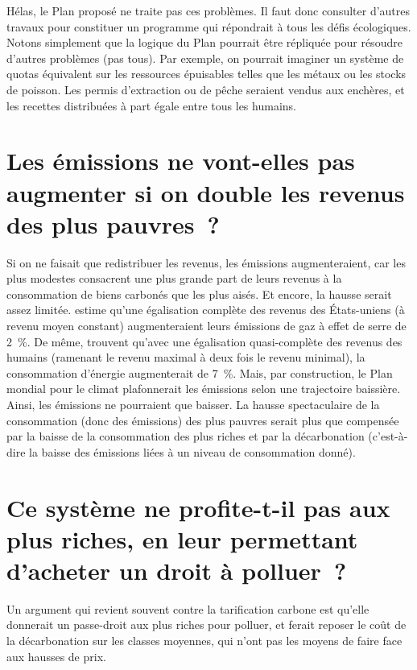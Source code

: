 \documentclass[a5paper,french,openany]{memoir}
\begin{document}
Hélas, le Plan proposé ne traite pas ces problèmes. Il faut donc consulter d'autres travaux pour constituer un programme qui répondrait à tous les défis écologiques. %
Notons simplement que la logique du Plan pourrait être répliquée pour résoudre d'autres problèmes (pas tous). Par exemple, on pourrait imaginer un système de quotas équivalent sur les ressources épuisables telles que les métaux ou les stocks de poisson. Les permis d'extraction %
ou de pêche seraient vendus aux enchères, et les recettes distribuées à part égale entre tous les humains.

\section*{\normalsize Les émissions ne vont-elles pas augmenter si on double les revenus des plus pauvres~?}\label{q:emissions}

Si on ne faisait que redistribuer les revenus, les émissions augmenteraient, car les plus modestes consacrent une plus grande part de leurs revenus à la consommation de biens carbonés que les plus aisés. Et encore, la hausse serait assez limitée. \cite{sager_income_2019} estime qu'une égalisation complète des revenus des États-uniens (à revenu moyen constant) augmenteraient leurs émissions de gaz à effet de serre de 2~\%. De même, \cite{oswald_global_2021} trouvent qu'avec une égalisation quasi-complète des revenus des humains (ramenant le revenu maximal à deux fois le revenu minimal), la consommation d'énergie augmenterait de 7~\%. 
Mais, par construction, le Plan mondial pour le climat plafonnerait les émissions selon une trajectoire baissière. Ainsi, les émissions ne pourraient que baisser. La hausse spectaculaire de la consommation (donc des émissions) des plus pauvres serait plus que compensée par la baisse de la consommation des plus riches et par la décarbonation (c'est-à-dire la baisse des émissions liées à un niveau de consommation donné).

\section*{\normalsize Ce système ne profite-t-il pas aux plus riches, en leur permettant d'acheter un droit à polluer~?}\label{q:riches}

Un argument qui revient souvent contre la tarification carbone est qu'elle donnerait un passe-droit aux plus riches pour polluer, et ferait reposer le coût de la décarbonation sur les classes moyennes, qui n'ont pas les moyens de faire face aux hausses de prix. 
\end{document}
